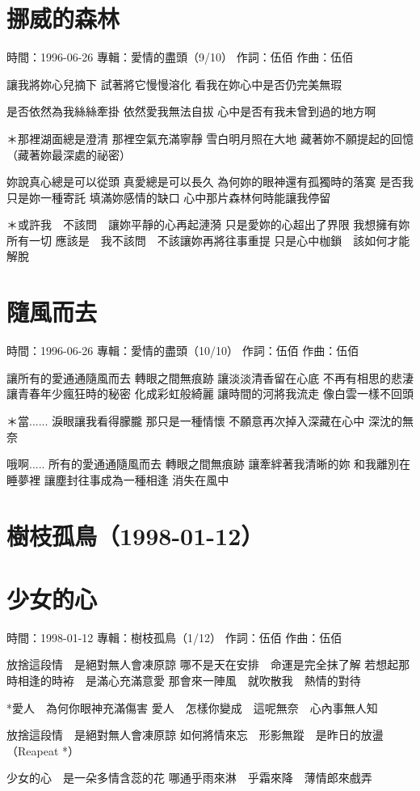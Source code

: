 \documentclass[UTF8,a4paper,oneside,twocolumn,12pt]{ctexbook}
\newcommand{\infopair}[2]{\textbullet #1：#2}
\newcommand{\zc}[1][伍佰]{\infopair{作詞}{#1}}
\newcommand{\zq}[1][伍佰]{\infopair{作曲}{#1}}
\newcommand{\zj}[1]{\infopair{專輯}{#1}}
\newcommand{\sj}[1]{\infopair{時間}{#1}}
\newenvironment{info}{\begin{flushleft}\kaishu
	}
	{\end{flushleft}\normalsize\yahei\par}
\newenvironment{lyric}{
	}
{}
\begin{document}
\section{挪威的森林}
\begin{info}
	\sj{1996-06-26}
	\zj{愛情的盡頭（9/10）}
	\zc
	\zq
\end{info}
\begin{lyric}
	讓我將妳心兒摘下
	試著將它慢慢溶化
	看我在妳心中是否仍完美無瑕

	是否依然為我絲絲牽掛
	依然愛我無法自拔
	心中是否有我未曾到過的地方啊

	＊那裡湖面總是澄清
	那裡空氣充滿寧靜
	雪白明月照在大地
	藏著妳不願提起的回憶
	（藏著妳最深處的祕密）

	妳說真心總是可以從頭
	真愛總是可以長久
	為何妳的眼神還有孤獨時的落寞
	是否我只是妳一種寄託
	填滿妳感情的缺口
	心中那片森林何時能讓我停留

	＊或許我　不該問　讓妳平靜的心再起漣漪
	只是愛妳的心超出了界限
	我想擁有妳所有一切
	應該是　我不該問　不該讓妳再將往事重提
	只是心中枷鎖　該如何才能解脫
\end{lyric}


\section{隨風而去}
\begin{info}
	\sj{1996-06-26}
	\zj{愛情的盡頭（10/10）}
	\zc
	\zq
\end{info}
\begin{lyric}
	讓所有的愛通通隨風而去
	轉眼之間無痕跡
	讓淡淡清香留在心底
	不再有相思的悲淒
	讓青春年少瘋狂時的秘密
	化成彩虹般綺麗
	讓時間的河將我流走
	像白雲一樣不回頭

	＊當......
	淚眼讓我看得朦朧
	那只是一種情懷
	不願意再次掉入深藏在心中
	深沈的無奈

	哦啊.....
	所有的愛通通隨風而去
	轉眼之間無痕跡
	讓牽絆著我清晰的妳
	和我離別在睡夢裡
	讓塵封往事成為一種相逢
	消失在風中
\end{lyric}

\section*{樹枝孤鳥（1998-01-12）}
\section{少女的心}
\begin{info}
	\sj{1998-01-12}
	\zj{樹枝孤鳥（1/12）}
	\zc
	\zq
\end{info}
\begin{lyric}
	放捨這段情　是絕對無人會凍原諒
	哪不是天在安排　命運是完全抹了解
	若想起那時相逢的時袸　是滿心充滿意愛
	那會來一陣風　就吹散我　熱情的對待

	*愛人　為何你眼神充滿傷害
	愛人　怎樣你變成　這呢無奈　心內事無人知

	放捨這段情　是絕對無人會凍原諒
	如何將情來忘　形影無蹤　是昨日的放盪
	（Reapeat *）

	少女的心　是一朵多情含蕊的花
	哪通乎雨來淋　乎霜來降　薄情郎來戲弄
\end{lyric}
\end{document}
